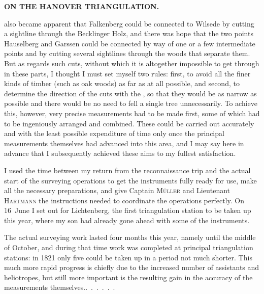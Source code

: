 \par\clearpage
\noindent\null\hfill{\small\textbf{ON THE HANOVER TRIANGULATION.}}\hfill{}\par\medskip
\noindent also became apparent that Falkenberg could be connected to Wilsede by
cutting a sightline through the Becklinger Holz, and there was hope that
the two points Hauselberg and Garssen could be connected by way of one or a few
intermediate points and by cutting several sightlines through the woods that
separate them. But as regards such cuts, without which it is altogether
impossible to get through in these parts, I thought I must set myself two rules:
first, to avoid all the finer kinds of timber (such as oak woods) as far as
at all possible, and second, to determine the direction of the cuts
 with the , so that they would be as
narrow as possible and there would be no need to fell a single tree unnecessarily.
To achieve this, however, very precise measurements had to be made first, some
of which had to be ingeniously arranged and combined. These could be carried
out accurately and with the least possible expenditure of time only once the
principal measurements themselves had advanced into this area, and I may say
here in advance that I subsequently achieved these aims to my fullest
satisfaction.

I used the time between my return from the reconnaissance trip and the actual
start of the surveying operations to get the instruments fully ready for use,
make all the necessary preparations, and give Captain \textsc{Müller} and
Lieutenant \textsc{Hartmann} the instructions needed to coordinate the operations
perfectly. On 16~June I set out for Lichtenberg, the first triangulation station
to be taken up this year, where my son had already gone ahead with some of the
instruments.

The actual surveying work lasted four months this year, namely until the middle
of October, and during that time work was completed at 
principal triangulation stations: in 1821 only five could be taken up in a period not
much shorter. This much more rapid progress is chiefly due to the increased
number of assistants and heliotropes, but still more important is the resulting
gain in the accuracy of the measurements themselves.\quad\mbox{.\ .\ .\ .\ .\ .}


